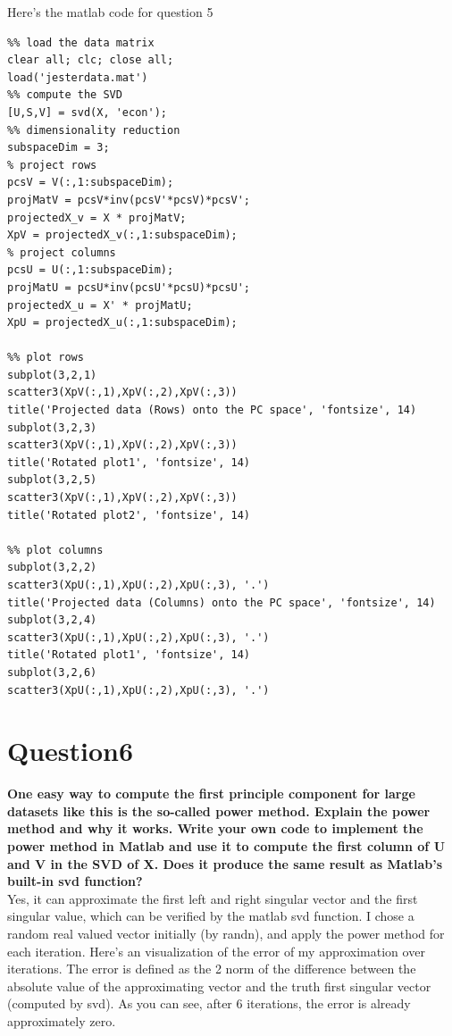\documentclass[paper=a4, fontsize=11pt]{scrartcl} %
\numberwithin{equation}{section} %
\numberwithin{figure}{section} %
\numberwithin{table}{section} %
\begin{document}
\newpage
Here's the matlab code for question 5
\begin{lstlisting}
%% load the data matrix
clear all; clc; close all; 
load('jesterdata.mat')
%% compute the SVD
[U,S,V] = svd(X, 'econ');
%% dimensionality reduction 
subspaceDim = 3; 
% project rows
pcsV = V(:,1:subspaceDim);
projMatV = pcsV*inv(pcsV'*pcsV)*pcsV';
projectedX_v = X * projMatV;
XpV = projectedX_v(:,1:subspaceDim);
% project columns
pcsU = U(:,1:subspaceDim);
projMatU = pcsU*inv(pcsU'*pcsU)*pcsU';
projectedX_u = X' * projMatU;
XpU = projectedX_u(:,1:subspaceDim);

%% plot rows 
subplot(3,2,1)
scatter3(XpV(:,1),XpV(:,2),XpV(:,3))
title('Projected data (Rows) onto the PC space', 'fontsize', 14)
subplot(3,2,3)
scatter3(XpV(:,1),XpV(:,2),XpV(:,3))
title('Rotated plot1', 'fontsize', 14)
subplot(3,2,5)
scatter3(XpV(:,1),XpV(:,2),XpV(:,3))
title('Rotated plot2', 'fontsize', 14)

%% plot columns 
subplot(3,2,2)
scatter3(XpU(:,1),XpU(:,2),XpU(:,3), '.')
title('Projected data (Columns) onto the PC space', 'fontsize', 14)
subplot(3,2,4)
scatter3(XpU(:,1),XpU(:,2),XpU(:,3), '.')
title('Rotated plot1', 'fontsize', 14)
subplot(3,2,6)
scatter3(XpU(:,1),XpU(:,2),XpU(:,3), '.')
\end{lstlisting}

\newpage
\section*{Question6}
\textbf{One easy way to compute the first principle component for large datasets like this is the so-called power method. Explain the power method and why it works. Write your own code to implement the power method in Matlab and use it to compute the first column of U and V in the SVD of X. Does it produce the same result as Matlab's built-in svd function?}\\


Yes, it can approximate the first left and right singular vector and the first singular value, which can be verified by the matlab svd function. I chose a random real valued vector initially (by randn), and apply the power method for each iteration. Here's an visualization of the error of my approximation over iterations. The error is defined as the 2 norm of the difference between the absolute value of the approximating vector and the truth first singular vector (computed by svd). As you can see, after 6 iterations, the error is already approximately zero. 
\end{document}
